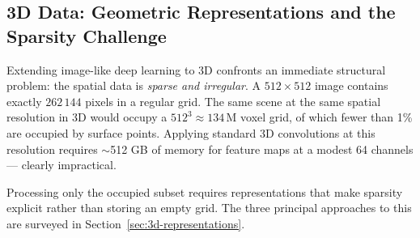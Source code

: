 \subsection{3D Data: Geometric Representations and the Sparsity Challenge}

Extending image-like deep learning to 3D confronts an immediate structural
problem: the spatial data is \emph{sparse and irregular}.
A $512 \times 512$ image contains exactly $262\,144$ pixels in a regular grid.
The same scene at the same spatial resolution in 3D would occupy a
$512^3 \approx 134\,\text{M}$ voxel grid, of which fewer than 1\% are
occupied by surface points.
Applying standard 3D convolutions at this resolution requires $\sim$512 GB
of memory for feature maps at a modest 64 channels --- clearly impractical.

Processing only the occupied subset requires representations that make
sparsity explicit rather than storing an empty grid.
The three principal approaches to this are surveyed in
Section~\ref{sec:3d-representations}.


